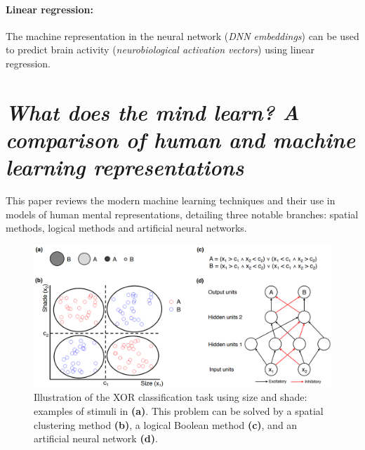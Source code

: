 \paragraph{Linear regression:} The machine representation in the neural network (\textit{DNN embeddings}) can be used to predict brain activity (\textit{neurobiological activation vectors}) using linear regression.

\section[Spatial methods, Logical methods and Artificial neural networks]{\textit{What does the mind learn? A comparison of human and machine learning representations}\\ }

This paper reviews the modern machine learning techniques and their use in models of human mental representations, detailing three notable branches: spatial methods, logical methods and artificial neural networks.
\begin{figure}[ht]
    \centering
    \captionsetup{width=.8\linewidth}
    \includegraphics[width=0.75\linewidth]{images/xor.png}
    \caption{Illustration of the XOR classification task using size and shade: examples of stimuli in \textbf{(a)}. This problem can be solved by a spatial clustering method \textbf{(b)}, a logical Boolean method \textbf{(c)}, and an artificial neural network \textbf{(d)}.}
\end{figure}

